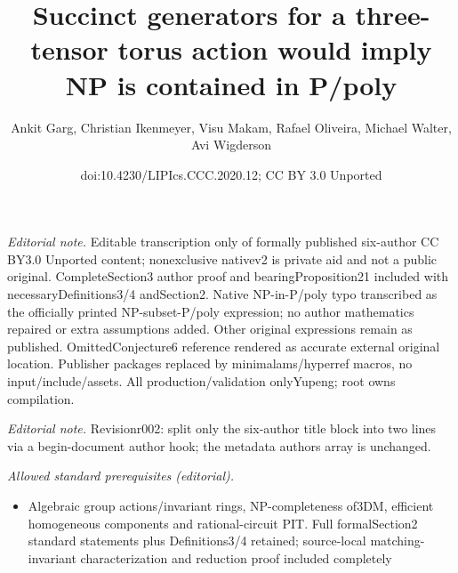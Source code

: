\documentclass[10pt,a4paper]{article}
\title{Succinct generators for a three-tensor torus action would imply NP is contained in P/poly}
\author{Ankit Garg, Christian Ikenmeyer, Visu Makam, Rafael Oliveira, Michael Walter, Avi Wigderson}
\date{doi:10.4230/LIPIcs.CCC.2020.12; CC BY 3.0 Unported}
\begin{document}
\maketitle
\noindent\textit{Editorial note.} Editable transcription only of formally published six-author CC BY3.0 Unported content; nonexclusive nativev2 is private aid and not a public original. CompleteSection3 author proof and bearingProposition21 included with necessaryDefinitions3/4 andSection2. Native NP-in-P/poly typo transcribed as the officially printed NP-subset-P/poly expression; no author mathematics repaired or extra assumptions added. Other original expressions remain as published. OmittedConjecture6 reference rendered as accurate external original location. Publisher packages replaced by minimalams/hyperref macros, no input/include/assets. All production/validation onlyYupeng; root owns compilation.\par\medskip
\noindent\textit{Editorial note.} Revisionr002: split only the six-author title block into two lines via a begin-document author hook; the metadata authors array is unchanged.\par\medskip
\noindent\textit{Allowed standard prerequisites (editorial).}\begin{itemize}
\item Algebraic group actions/invariant rings, NP-completeness of3DM, efficient homogeneous components and rational-circuit PIT. Full formalSection2 standard statements plus Definitions3/4 retained; source-local matching-invariant characterization and reduction proof included completely
\end{itemize}\medskip
\end{document}
